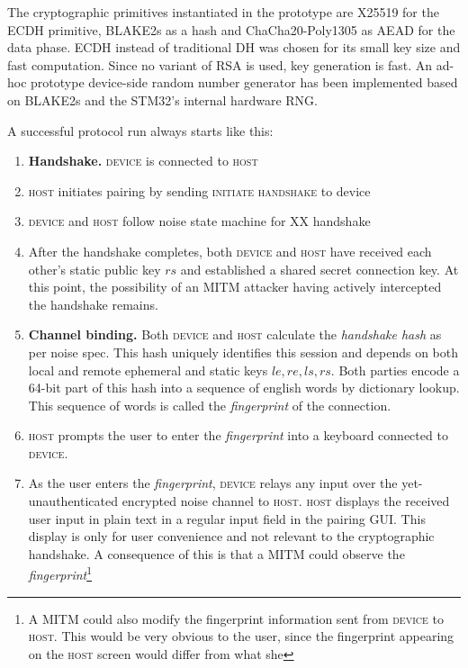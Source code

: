 \documentclass[12pt,a4paper,notitlepage]{article}
\begin{document}
The cryptographic primitives instantiated in the prototype are X25519 for the ECDH primitive, BLAKE2s as a hash and
ChaCha20-Poly1305 as AEAD for the data phase. ECDH instead of traditional DH was chosen for its small key size and fast
computation. Since no variant of RSA is used, key generation is fast. An ad-hoc prototype device-side random number
generator has been implemented based on BLAKE2s and the STM32's internal hardware RNG.

A successful protocol run always starts like this:
\begin{enumerate}
\item \textbf{Handshake.} \textsc{device} is connected to \textsc{host}
\item \textsc{host} initiates pairing by sending \textsc{initiate handshake} to device
\item \textsc{device} and \textsc{host} follow noise state machine for \textsc{XX} handshake
\item After the handshake completes, both \textsc{device} and \textsc{host} have received each other's static public key
    $rs$ and established a shared secret connection key. At this point, the possibility of an MITM attacker having
    actively intercepted the handshake remains.
\item \textbf{Channel binding.} Both \textsc{device} and \textsc{host} calculate the \emph{handshake hash} as per noise spec\cite{perrin01}. This
    hash uniquely identifies this session and depends on both local and remote ephemeral and static keys $le, re, ls,
    rs$.  Both parties encode a 64-bit part of this hash into a sequence of english words by dictionary lookup. This
    sequence of words is called the \emph{fingerprint} of the connection.
\item \textsc{host} prompts the user to enter the \emph{fingerprint} into a keyboard connected to \textsc{device}.
\item As the user enters the \emph{fingerprint}, \textsc{device} relays any input over the yet-unauthenticated encrypted
    noise channel to \textsc{host}. \textsc{host} displays the received user input in plain text in a regular input
    field in the pairing GUI. This display is only for user convenience and not relevant to the cryptographic handshake.
    A consequence of this is that a MITM could observe the \emph{fingerprint}\footnote{
        A MITM could also modify the fingerprint information sent from \textsc{device} to \textsc{host}. This would be
        very obvious to the user, since the fingerprint appearing on the \textsc{host} screen would differ from what she
}
\end{enumerate}
\end{document}
